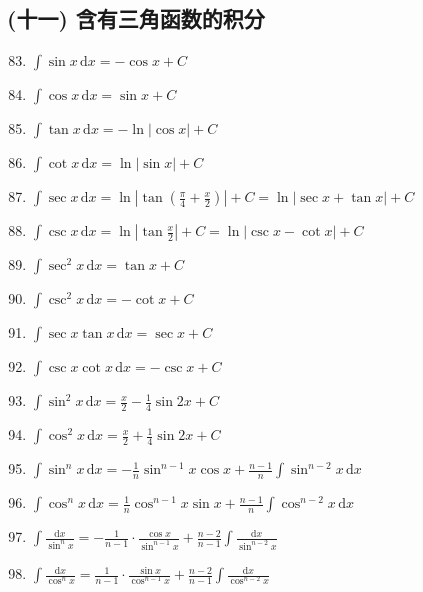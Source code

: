 \subsection*{(十一) 含有三角函数的积分}

\begin{enumerate}
    \setcounter{enumi}{82}
    \item $\displaystyle \int \sin x \, \mathrm{d}x = -\cos x + C$
    \item $\displaystyle \int \cos x \, \mathrm{d}x = \sin x + C$
    \item $\displaystyle \int \tan x \, \mathrm{d}x = -\ln |\cos x| + C$
    \item $\displaystyle \int \cot x \, \mathrm{d}x = \ln |\sin x| + C$
    \item $\displaystyle \int \sec x \, \mathrm{d}x = \ln \left| \tan \left( \frac{\pi}{4} + \frac{x}{2} \right) \right| + C = \ln |\sec x + \tan x| + C$
    \item $\displaystyle \int \csc x \, \mathrm{d}x = \ln \left| \tan \frac{x}{2} \right| + C = \ln |\csc x - \cot x| + C$
    \item $\displaystyle \int \sec^2 x \, \mathrm{d}x = \tan x + C$
    \item $\displaystyle \int \csc^2 x \, \mathrm{d}x = -\cot x + C$
    \item $\displaystyle \int \sec x \tan x \, \mathrm{d}x = \sec x + C$
    \item $\displaystyle \int \csc x \cot x \, \mathrm{d}x = -\csc x + C$
    \item $\displaystyle \int \sin^2 x \, \mathrm{d}x = \frac{x}{2} - \frac{1}{4} \sin 2x + C$
    \item $\displaystyle \int \cos^2 x \, \mathrm{d}x = \frac{x}{2} + \frac{1}{4} \sin 2x + C$
    \item $\displaystyle \int \sin^n x \, \mathrm{d}x = -\frac{1}{n} \sin^{n-1} x \cos x + \frac{n - 1}{n} \int \sin^{n-2} x \, \mathrm{d}x$
    \item $\displaystyle \int \cos^n x \, \mathrm{d}x = \frac{1}{n} \cos^{n-1} x \sin x + \frac{n - 1}{n} \int \cos^{n-2} x \, \mathrm{d}x$
    \item $\displaystyle \int \frac{\mathrm{d}x}{\sin^n x} = -\frac{1}{n - 1} \cdot \frac{\cos x}{\sin^{n-1} x} + \frac{n - 2}{n - 1} \int \frac{\mathrm{d}x}{\sin^{n-2} x}$
    \item $\displaystyle \int \frac{\mathrm{d}x}{\cos^n x} = \frac{1}{n - 1} \cdot \frac{\sin x}{\cos^{n-1} x} + \frac{n - 2}{n - 1} \int \frac{\mathrm{d}x}{\cos^{n-2} x}$

\end{enumerate}
